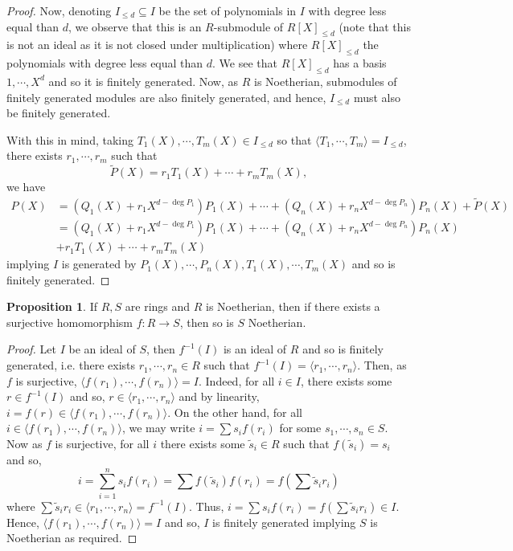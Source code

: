 \documentclass[]{article}
\theoremstyle{definition}
\theoremstyle{definition}
\newtheorem{proposition}{Proposition}[section]
\begin{document}
\begin{proof}
  Now, denoting \(I_{\le d} \subseteq I\) be the set of polynomials in \(I\) with 
  degree less equal than \(d\), we observe that this is an \(R\)-submodule of 
  \(R[X]_{\le d}\) (note that this is not an ideal as it is not closed under multiplication) 
  where \(R[X]_{\le d}\) the polynomials with degree less equal than \(d\). 
  We see that \(R[X]_{\le d}\) has a basis \(1, \cdots, X^d\) and so it is 
  finitely generated. Now, as \(R\) is Noetherian, submodules of finitely 
  generated modules are also finitely generated, and hence, \(I_{\le d}\) must 
  also be finitely generated. 

  With this in mind, taking \(T_1(X), \cdots, T_m(X) \in I_{\le d}\) so that 
  \(\langle T_1, \cdots, T_m \rangle = I_{\le d}\), there exists 
  \(r_1, \cdots, r_m\) such that 
  \[\tilde P(X) = r_1 T_1(X) + \cdots + r_m T_m(X),\]
  we have 
  \[\begin{split}
    P(X) & = (Q_1(X) + r_1X^{d - \deg P_1})P_1(X) + \cdots +
    (Q_n(X) + r_nX^{d - \deg P_n})P_n(X) + \tilde P(X)\\
    & = (Q_1(X) + r_1X^{d - \deg P_1})P_1(X) + \cdots +
    (Q_n(X) + r_nX^{d - \deg P_n})P_n(X)\\
    & + r_1 T_1(X) + \cdots + r_m T_m(X)
  \end{split}\]
  implying \(I\) is generated by \(P_1(X), \cdots, P_n(X), T_1(X), \cdots, T_m(X)\)
  and so is finitely generated.
\end{proof}

\begin{proposition}
  If \(R, S\) are rings and \(R\) is Noetherian, then if there exists a surjective 
  homomorphism \(f : R \to S\), then so is \(S\) Noetherian.
\end{proposition}
\begin{proof}
Let \(I\) be an ideal of \(S\), then \(f^{-1}(I)\) is 
an ideal of \(R\) and so is finitely generated, i.e. there exists 
\(r_1, \cdots, r_n \in R\) such that \(f^{-1}(I) = \langle r_1, \cdots, r_n\rangle\).
Then, as \(f\) is surjective, \(\langle f(r_1), \cdots, f(r_n)\rangle = I\).
Indeed, for all \(i \in I\), there exists some \(r \in f^{-1}(I)\) and so, 
\(r \in \langle r_1, \cdots, r_n\rangle\) and by linearity, \(i = f(r) 
\in \langle f(r_1), \cdots, f(r_n)\rangle\). On the other hand, 
for all \(i \in \langle f(r_1), \cdots, f(r_n)\rangle\), we may write 
\(i = \sum s_i f(r_i)\) for some \(s_1, \cdots, s_n \in S\). Now as \(f\) is 
surjective, for all \(i\) there exists some \(\tilde s_i \in R\) such that 
\(f(\tilde s_i) = s_i\) and so, 
\[i = \sum_{i = 1}^n s_i f(r_i) = \sum f(\tilde s_i) f(r_i) = 
  f\left(\sum \tilde s_i r_i\right)\]
where \(\sum \tilde s_i r_i \in \langle r_1, \cdots, r_n\rangle = 
f^{-1}(I)\). Thus, \(i = \sum s_i f(r_i) = f(\sum \tilde s_i r_i) \in I\).
Hence, \(\langle f(r_1), \cdots, f(r_n)\rangle = I\) and so, 
\(I\) is finitely generated implying \(S\) is Noetherian as required.
\end{proof}
\end{document}
